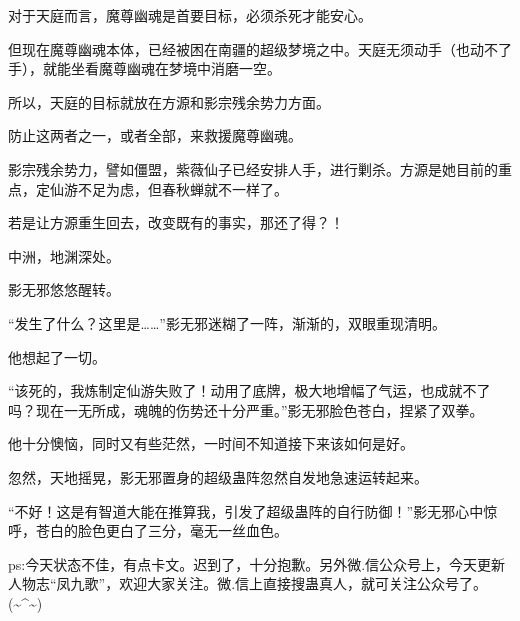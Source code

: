 \begin{this_body}
对于天庭而言，魔尊幽魂是首要目标，必须杀死才能安心。

但现在魔尊幽魂本体，已经被困在南疆的超级梦境之中。天庭无须动手（也动不了手），就能坐看魔尊幽魂在梦境中消磨一空。

所以，天庭的目标就放在方源和影宗残余势力方面。

防止这两者之一，或者全部，来救援魔尊幽魂。

影宗残余势力，譬如僵盟，紫薇仙子已经安排人手，进行剿杀。方源是她目前的重点，定仙游不足为虑，但春秋蝉就不一样了。

若是让方源重生回去，改变既有的事实，那还了得？！

中洲，地渊深处。

影无邪悠悠醒转。

“发生了什么？这里是……”影无邪迷糊了一阵，渐渐的，双眼重现清明。

他想起了一切。

“该死的，我炼制定仙游失败了！动用了底牌，极大地增幅了气运，也成就不了吗？现在一无所成，魂魄的伤势还十分严重。”影无邪脸色苍白，捏紧了双拳。

他十分懊恼，同时又有些茫然，一时间不知道接下来该如何是好。

忽然，天地摇晃，影无邪置身的超级蛊阵忽然自发地急速运转起来。

“不好！这是有智道大能在推算我，引发了超级蛊阵的自行防御！”影无邪心中惊呼，苍白的脸色更白了三分，毫无一丝血色。

ps:今天状态不佳，有点卡文。迟到了，十分抱歉。另外微.信公众号上，今天更新人物志“凤九歌”，欢迎大家关注。微.信上直接搜蛊真人，就可关注公众号了。(\~{}\^{}\~{})

\end{this_body}

